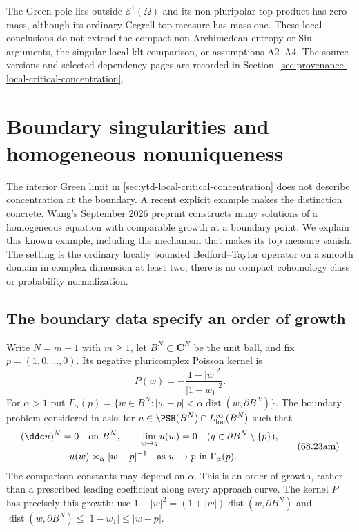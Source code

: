 The Green pole lies outside $\mathcal E^1(\Omega)$ and its
non-pluripolar top product has zero mass, although its ordinary
Cegrell top measure has mass one. These local conclusions do not
extend the compact non-Archimedean entropy or Siu arguments, the
singular local klt comparison, or assumptions A2--A4. The source
versions and selected dependency pages are recorded in
Section~\ref{sec:provenance-local-critical-concentration}.

\section{Boundary singularities and homogeneous nonuniqueness}
\label{sec:ytd-boundary-poisson-nonuniqueness}

The interior Green limit in
\cref{sec:ytd-local-critical-concentration} does not describe concentration
at the boundary. A recent explicit example makes the distinction concrete.
Wang's September 2026 preprint
\cite[Theorems~1.2 and~3.5]{Wang26PoissonV1} constructs many solutions
of a homogeneous equation with comparable growth at a boundary point.
We explain this known example, including the mechanism that makes its
top measure vanish. The setting is the ordinary locally bounded
Bedford--Taylor operator on a smooth domain in complex dimension at least
two; there is no compact cohomology class or probability normalization.

\subsection{The boundary data specify an order of growth}
\label{sec:ytd-boundary-poisson-data}

Write $N=m+1$ with $m\geq1$, let $B^N\subset\mathbf C^N$ be the unit
ball, and fix $p=(1,0,\ldots,0)$. Its negative pluricomplex Poisson kernel
is
\[
 P(w)=-\frac{1-|w|^2}{|1-w_1|^2}.
\tag{68.23al}\label{eq:ytd-boundary-poisson-kernel}
\]
For $\alpha>1$ put
$\Gamma_\alpha(p)=\{w\in B^N:|w-p|<\alpha\operatorname{dist}(w,\partial B^N)\}$.
The boundary problem considered in
\cite[(1.2)]{Wang26PoissonV1} asks for $u\in\PSH(B^N)\cap
L^\infty_{\rm loc}(B^N)$ such that
\[
\begin{gathered}
 (\ddc u)^N=0\quad\hbox{on }B^N,\qquad
 \lim_{w\to q}u(w)=0\quad(q\in\partial B^N\setminus\{p\}),\\
 -u(w)\asymp_\alpha |w-p|^{-1}
 \quad\hbox{as }w\to p\hbox{ in }\Gamma_\alpha(p).
\end{gathered}
\tag{68.23am}\label{eq:ytd-boundary-poisson-problem}
\]
The comparison constants may depend on $\alpha$. This is an order of
growth, rather than a prescribed leading coefficient along every
approach curve. The kernel $P$ has precisely this growth: use
$1-|w|^2=(1+|w|)\operatorname{dist}(w,\partial B^N)$ and
$\operatorname{dist}(w,\partial B^N)\leq|1-w_1|\leq|w-p|$.

